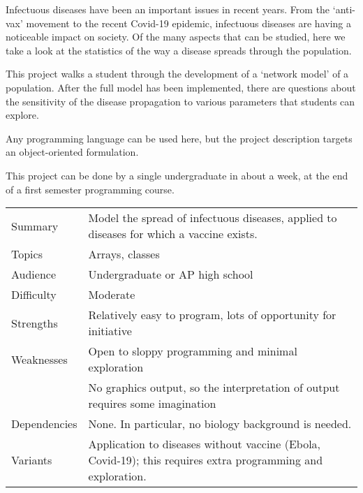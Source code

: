 
Infectuous diseases have been an important issues in recent years.
From the `anti-vax' movement to the recent Covid-19 epidemic,
infectuous diseases are having a noticeable impact on society.
Of the many aspects that can be studied, here we take a look
at the statistics of the way a disease spreads through the population.

This project walks a student through the development
of a `network model' of a population.
After the full model has been implemented, there are questions
about the sensitivity of the disease propagation to various parameters
that students can explore.

Any programming language can be used here, but the project
description targets an object-oriented formulation.

This project can be done by a single undergraduate in about a week,
at the end of a first semester programming course.

\newpage

\begin{tabular}{|l|p{5in}|}
  \hline
  Summary&Model the spread of infectuous diseases, applied
  to diseases for which a vaccine exists.
  \\
  Topics&Arrays, classes
  \\
  Audience&Undergraduate or AP high school
  \\
  Difficulty&Moderate
  \\
  Strengths&Relatively easy to program, lots of opportunity for initiative
  \\
  Weaknesses&Open to sloppy programming and minimal exploration
  \\
  &No graphics output, so the interpretation of output requires some imagination
  \\
  Dependencies&None. In particular, no biology background is needed.
  \\
  Variants&Application to diseases without vaccine (Ebola, Covid-19);
  this requires extra programming and exploration.
  \\
  \hline
\end{tabular}
